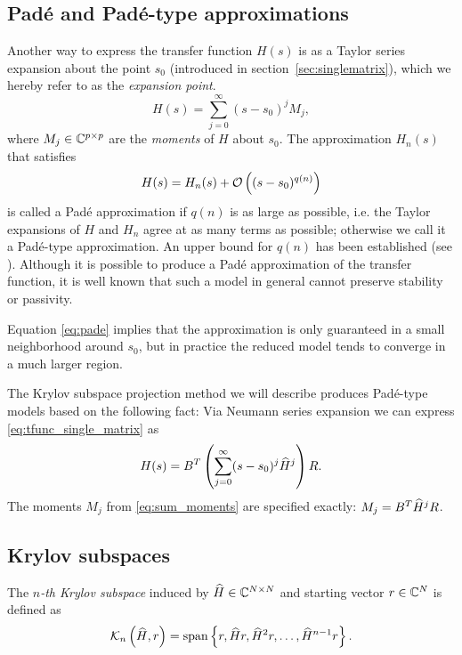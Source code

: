 \documentclass[letterpaper]{article}
\theoremstyle{remark}
\begin{document}
\begin{description}
\subsection{Pad\'{e} and Pad\'{e}-type approximations}
	Another way to express the transfer function $H(s)$ is as a Taylor series
	expansion about the point $s_0$ (introduced in section~\ref{sec:singlematrix}),
	which we hereby refer to as the \emph{expansion point}.
	\begin{equation}
		H(s) = \sum_{j=0}^\infty (s-s_0)^jM_j,
		\label{eq:sum_moments}
	\end{equation}
	where $M_j\in \mathbb{C}^{p\times p}$ are the \emph{moments} of $H$ about $s_0$.  
	The approximation $H_n(s)$ that satisfies
	\begin{equation}
		H(s) = H_n(s) + \mathcal{O}\left( (s-s_0)^{q(n)} \right)
		\label{eq:pade}
	\end{equation}
	is called a Pad\'{e} approximation if $q(n)$ is as large as possible, i.e. the 
	Taylor
	expansions of $H$ and $H_n$ agree at as many terms as possible; otherwise we 
	call it a Pad\'{e}-type approximation.  An upper bound for $q(n)$ has been
	established  (see \cite{AN}). 
	Although it is possible to produce a Pad\'{e}
	approximation of the transfer function, it is well known  
	that such a model in general cannot preserve stability or passivity.  
	
	Equation \eqref{eq:pade} implies  
	that the approximation is only guaranteed in a small neighborhood around $s_0$, 
	but in practice the reduced model tends to converge in a much larger region. 

	The Krylov subspace projection method we will describe produces Pad\'{e}-type models
	based on the following fact: Via Neumann series expansion we can 
	express \eqref{eq:tfunc_single_matrix} as
	\begin{equation}
		H(s) = B^T\left(\sum_{j=0}^\infty (s-s_0)^j\widehat{H}^j\right)R.
		\label{eq:neumann}
	\end{equation}
   The moments $M_j$ from \eqref{eq:sum_moments} are specified exactly: $M_j = B^T\widehat{H}^jR$.

   \subsection{Krylov subspaces}
   The \emph{$n$-th Krylov subspace} induced by $\widehat{H}\in\mathbb{C}^{N\times N}$ and 
      starting vector $r\in\mathbb{C}^N$ is
      defined as  
      \begin{equation}
   	  \mathcal{K}_{n}\left({\widehat{H}},{r} \right)= \mathrm{span} \left\{r, \widehat{H} r, \widehat{H}^2r,\ldots, \widehat{H}^{n-1}r\right\}.
   	  \label{eq:krylov_def}
      \end{equation}
      

\end{description}
\end{document}
